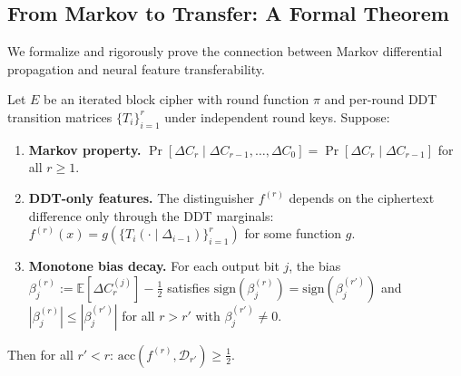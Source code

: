 \documentclass[runningheads]{llncs}
\begin{document}
\subsection{From Markov to Transfer: A Formal Theorem}

We formalize and rigorously prove the connection between Markov differential propagation and neural feature transferability.

\begin{theorem}
\label{thm:markov}
Let $E$ be an iterated block cipher with round function $\pi$
and per-round DDT transition matrices $\{T_i\}_{i=1}^{r}$ under
independent round keys. Suppose:
\begin{enumerate}[label=\textup{(C\arabic*)},itemsep=2pt]
  \item \textbf{Markov property.}
        $\Pr[\Delta C_r \mid \Delta C_{r-1}, \ldots, \Delta C_0]
        = \Pr[\Delta C_r \mid \Delta C_{r-1}]$ for all $r \geq 1$.
  \item \textbf{DDT-only features.}
        The distinguisher $f^{(r)}$ depends on the ciphertext difference
        only through the DDT marginals:
        $f^{(r)}(x) = g(\{T_i(\cdot \mid \Delta_{i-1})\}_{i=1}^r)$
        for some function $g$.
  \item \textbf{Monotone bias decay.}
        For each output bit $j$, the bias
        $\beta_j^{(r)} := \mathbb{E}[\Delta C_r^{(j)}] - \tfrac{1}{2}$
        satisfies $\mathrm{sign}(\beta_j^{(r)})
        = \mathrm{sign}(\beta_j^{(r')})$ and
        $|\beta_j^{(r)}| \leq |\beta_j^{(r')}|$
        for all $r > r'$ with $\beta_j^{(r')} \neq 0$.
\end{enumerate}
Then for all $r' < r$:
$\mathrm{acc}(f^{(r)}, \mathcal{D}_{r'}) \geq \tfrac{1}{2}$.
\end{theorem}
\end{document}
